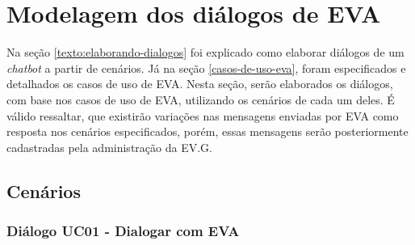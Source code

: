 \section{Modelagem dos diálogos de EVA}

Na seção \ref{texto:elaborando-dialogos} foi explicado como elaborar diálogos de um \textit{chatbot} a partir de cenários. Já na seção \ref{casos-de-uso-eva}, foram especificados e detalhados os casos de uso de EVA. Nesta seção, serão elaborados os diálogos, com base nos casos de uso de EVA, utilizando os cenários de cada um deles. É válido ressaltar, que existirão variações nas mensagens enviadas por EVA como resposta nos cenários especificados, porém, essas mensagens serão posteriormente cadastradas pela administração da EV.G.

\subsection{Cenários}

\subsubsection{Diálogo UC01 - Dialogar com EVA}


